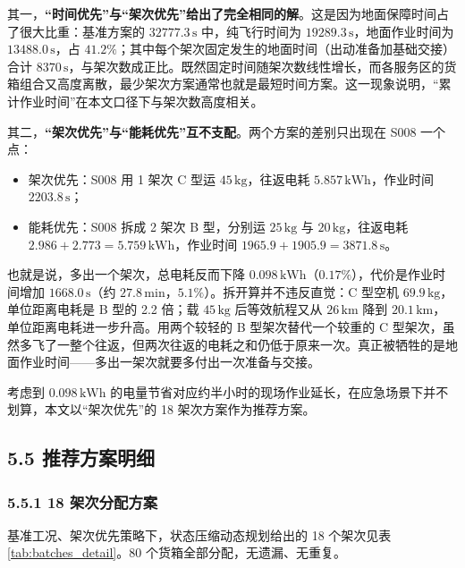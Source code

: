 \documentclass[withoutpreface,bwprint]{format}
\begin{document}
其一，\textbf{“时间优先”与“架次优先”给出了完全相同的解}。这是因为地面保障时间占了很大比重：基准方案的 $32777.3\,\text{s}$ 中，纯飞行时间为 $19289.3\,\text{s}$，地面作业时间为 $13488.0\,\text{s}$，占 $41.2\%$；其中每个架次固定发生的地面时间（出动准备加基础交接）合计 $8370\,\text{s}$，与架次数成正比。既然固定时间随架次数线性增长，而各服务区的货箱组合又高度离散，最少架次方案通常也就是最短时间方案。这一现象说明，“累计作业时间”在本文口径下与架次数高度相关。

其二，\textbf{“架次优先”与“能耗优先”互不支配}。两个方案的差别只出现在 S008 一个点：

\begin{itemize}
    \item 架次优先：S008 用 1 架次 C 型运 $45\,\text{kg}$，往返电耗 $5.857\,\text{kWh}$，作业时间 $2203.8\,\text{s}$；
    \item 能耗优先：S008 拆成 2 架次 B 型，分别运 $25\,\text{kg}$ 与 $20\,\text{kg}$，往返电耗 $2.986+2.773=5.759\,\text{kWh}$，作业时间 $1965.9+1905.9=3871.8\,\text{s}$。
\end{itemize}

也就是说，多出一个架次，总电耗反而下降 $0.098\,\text{kWh}$（$0.17\%$），代价是作业时间增加 $1668.0\,\text{s}$（约 $27.8\,\text{min}$，$5.1\%$）。拆开算并不违反直觉：C 型空机 $69.9\,\text{kg}$，单位距离电耗是 B 型的 2.2 倍；载 $45\,\text{kg}$ 后等效航程又从 $26\,\text{km}$ 降到 $20.1\,\text{km}$，单位距离电耗进一步升高。用两个较轻的 B 型架次替代一个较重的 C 型架次，虽然多飞了一整个往返，但两次往返的电耗之和仍低于原来一次。真正被牺牲的是地面作业时间——多出一架次就要多付出一次准备与交接。

考虑到 $0.098\,\text{kWh}$ 的电量节省对应约半小时的现场作业延长，在应急场景下并不划算，本文以“架次优先”的 18 架次方案作为推荐方案。

\subsection{5.5 推荐方案明细}

\subsubsection{5.5.1 18 架次分配方案}
基准工况、架次优先策略下，状态压缩动态规划给出的 18 个架次见表 \ref{tab:batches_detail}。80 个货箱全部分配，无遗漏、无重复。
\end{document}
